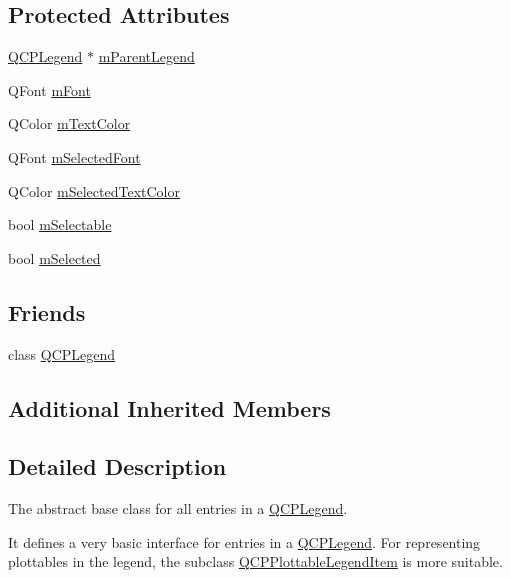 \subsection*{Protected Attributes}
\begin{DoxyCompactItemize}
\item 
\mbox{\hyperlink{class_q_c_p_legend}{Q\+C\+P\+Legend}} $\ast$ \mbox{\hyperlink{class_q_c_p_abstract_legend_item_aafcd9fc6fcb10f4a8d46037011afafe8}{m\+Parent\+Legend}}
\item 
Q\+Font \mbox{\hyperlink{class_q_c_p_abstract_legend_item_ae916a78ac0d2a60e20a17ca2f24f9754}{m\+Font}}
\item 
Q\+Color \mbox{\hyperlink{class_q_c_p_abstract_legend_item_a974b21e9930227d281344bd2242d289d}{m\+Text\+Color}}
\item 
Q\+Font \mbox{\hyperlink{class_q_c_p_abstract_legend_item_ab971df604306b192875a7d097feb1e21}{m\+Selected\+Font}}
\item 
Q\+Color \mbox{\hyperlink{class_q_c_p_abstract_legend_item_a4965c13854d970b24c284f0a4f005fbd}{m\+Selected\+Text\+Color}}
\item 
bool \mbox{\hyperlink{class_q_c_p_abstract_legend_item_aa84029f57b1b32f642fb7db63c3fc2c2}{m\+Selectable}}
\item 
bool \mbox{\hyperlink{class_q_c_p_abstract_legend_item_ae58ebebbd0c36cc6fe897483369984d2}{m\+Selected}}
\end{DoxyCompactItemize}
\subsection*{Friends}
\begin{DoxyCompactItemize}
\item 
class \mbox{\hyperlink{class_q_c_p_abstract_legend_item_a8429035e7adfbd7f05805a6530ad5e3b}{Q\+C\+P\+Legend}}
\end{DoxyCompactItemize}
\subsection*{Additional Inherited Members}


\subsection{Detailed Description}
The abstract base class for all entries in a \mbox{\hyperlink{class_q_c_p_legend}{Q\+C\+P\+Legend}}. 

It defines a very basic interface for entries in a \mbox{\hyperlink{class_q_c_p_legend}{Q\+C\+P\+Legend}}. For representing plottables in the legend, the subclass \mbox{\hyperlink{class_q_c_p_plottable_legend_item}{Q\+C\+P\+Plottable\+Legend\+Item}} is more suitable.

